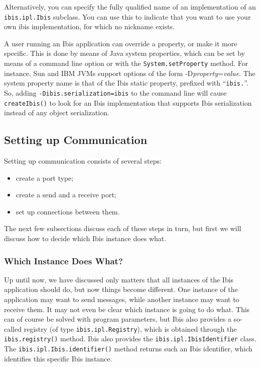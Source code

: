 \documentclass[10pt]{article}
\newcommand{\mysubsubsection}[1]{\subsubsection{#1}\label{#1}}
\begin{document}
\noindent
Alternatively, you can specify the fully qualified name of an
implementation of an \texttt{ibis.ipl.Ibis} subclass. You can use this
to indicate that you want to use your own ibis implementation, for which no nickname exists.

A user running an Ibis application can override a property, or make
it more specific. This is done by means of Java system properties,
which can be set by means of a command line option or with the
\texttt{System.setProperty} method.
For instance, Sun and IBM JVMs support options of the form
-D\emph{property}=\emph{value}.  The system property name is that
of the Ibis static property, prefixed with ``\texttt{ibis.}''.  So,
adding \texttt{-Dibis.serialization=ibis} to the command line will cause
\texttt{createIbis()} to look for an Ibis implementation
that supports Ibis serialization instead of any object serialization.

\subsection{Setting up Communication}

Setting up communication consists of several steps:
\begin{itemize}
\item
create a port type;
\item
create a send and a receive port;
\item
set up connections between them.
\end{itemize}

\noindent
The next few subsections discuss each of these steps in turn, but
first we will discuss how to decide which Ibis instance does what.

\mysubsubsection{Which Instance Does What?}

Up until now, we have discussed only matters that all instances of
the Ibis application should do, but now things become different.
One instance of the application may want to send messages, while
another instance may want to receive them.
It may not even be clear which instance is going to do what.
This can of course be solved with program parameters, but Ibis
also provides a so-called registry (of type
\texttt{ibis.ipl.Registry}), which is obtained through the
\texttt{ibis.registry()} method.
Ibis also provides the \texttt{ibis.ipl.IbisIdentifier} class.
The \texttt{ibis.ipl.Ibis.identifier()} method returns such an
Ibis identifier, which identifies this specific Ibis instance.
\end{document}
